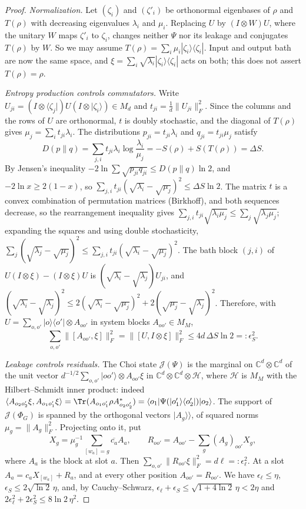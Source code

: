 \begin{proof}
\emph{Normalization.} Let $(\zeta_i)$ and $(\zeta'_i)$ be orthonormal eigenbases of $\rho$ and $T(\rho)$ with decreasing eigenvalues $\lambda_i$ and $\mu_i$.
Replacing $U$ by $(I\otimes W)U$, where the unitary $W$ maps $\zeta'_i$ to $\zeta_i$, changes neither $\Psi$ nor its leakage and conjugates $T(\rho)$
by $W$. So we may assume $T(\rho)=\sum_i\mu_i|\zeta_i\rangle\langle\zeta_i|$. Input and output bath are now the same space, and
$\xi=\sum_i\sqrt{\lambda_i}|\zeta_i\rangle\langle\zeta_i|$ acts on both; this does not assert $T(\rho)=\rho$.

\emph{Entropy production controls commutators.} Write $U_{ji}=(I\otimes\langle\zeta_j|)U(I\otimes|\zeta_i\rangle)\in M_d$ and $t_{ji}=\frac1d\|U_{ji}\|_F^2$.
Since the columns and the rows of $U$ are orthonormal, $t$ is doubly stochastic, and the diagonal of $T(\rho)$ gives $\mu_j=\sum_it_{ji}\lambda_i$. The
distributions $p_{ji}=t_{ji}\lambda_i$ and $q_{ji}=t_{ji}\mu_j$ satisfy
\[
D(p\|q)=\sum_{j,i}t_{ji}\lambda_i\log\frac{\lambda_i}{\mu_j}=-S(\rho)+S(T(\rho))=\Delta S .
\]
By Jensen's inequality $-2\ln\sum\sqrt{p_{ji}q_{ji}}\le D(p\|q)\ln2$, and $-2\ln x\ge2(1-x)$, so
$\sum_{j,i}t_{ji}(\sqrt{\lambda_i}-\sqrt{\mu_j})^2\le\Delta S\ln2$. The matrix $t$ is a convex combination of permutation matrices (Birkhoff), and both sequences
decrease, so the rearrangement inequality gives $\sum_{j,i}t_{ji}\sqrt{\lambda_i\mu_j}\le\sum_j\sqrt{\lambda_j\mu_j}$; expanding the squares and using
double stochasticity, $\sum_j(\sqrt{\lambda_j}-\sqrt{\mu_j})^2\le\sum_{j,i}t_{ji}(\sqrt{\lambda_i}-\sqrt{\mu_j})^2$. The bath block $(j,i)$ of $U(I\otimes\xi)-(I\otimes\xi)U$
is $(\sqrt{\lambda_i}-\sqrt{\lambda_j})U_{ji}$, and $(\sqrt{\lambda_i}-\sqrt{\lambda_j})^2\le2(\sqrt{\lambda_i}-\sqrt{\mu_j})^2+2(\sqrt{\mu_j}-\sqrt{\lambda_j})^2$.
Therefore, with $U=\sum_{o,o'}|o\rangle\langle o'|\otimes A_{oo'}$ in system blocks $A_{oo'}\in M_M$,
\begin{equation}\label{eq:block-commutators}
\sum_{o,o'}\|[A_{oo'},\xi]\|_F^2=\|[U,I\otimes\xi]\|_F^2\le4d\,\Delta S\ln2=:\epsilon_S^2 .
\end{equation}

\emph{Leakage controls residuals.} The Choi state $\mathcal J(\Psi)$ is the marginal on $\mathbb C^d\otimes\mathbb C^d$ of the unit vector
$d^{-1/2}\sum_{o,o'}|oo'\rangle\otimes A_{oo'}\xi$ in $\mathbb C^d\otimes\mathbb C^d\otimes\mathcal H$, where $\mathcal H$ is $M_M$ with the Hilbert--Schmidt
inner product: indeed $\langle A_{o_2o_2'}\xi,A_{o_1o_1'}\xi\rangle=\Tr(A_{o_1o_1'}\rho A_{o_2o_2'}^*)=\langle o_1|\Psi(|o_1'\rangle\langle o_2'|)|o_2\rangle$. The support
of $\mathcal J(\Phi_G)$ is spanned by the orthogonal vectors $|A_g\rangle\!\rangle$, of squared norms $\mu_g=\|A_g\|_F^2$. Projecting onto it, put
\[
X_g=\mu_g^{-1}\sum_{[w_a]=g}\overline{c_a}A_a,\qquad R_{oo'}=A_{oo'}-\sum_g(A_g)_{oo'}X_g,
\]
where $A_a$ is the block at slot $a$. Then $\sum_{o,o'}\|R_{oo'}\xi\|_F^2=d\ell=:\epsilon_\ell^2$. At a slot $A_a=c_aX_{[w_a]}+R_a$, and at every other position
$A_{oo'}=R_{oo'}$. We have $\epsilon_\ell\le\eta$, $\epsilon_S\le2\sqrt{\ln2}\,\eta$, and, by Cauchy--Schwarz, $\epsilon_\ell+\epsilon_S\le\sqrt{1+4\ln2}\,\eta<2\eta$ and
$2\epsilon_\ell^2+2\epsilon_S^2\le8\ln2\,\eta^2$.


\end{proof}
